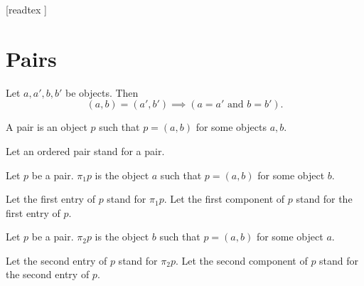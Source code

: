 \documentclass[10pt]{article}
\begin{document}
  \begin{imports}
    \begin{forthel}

      [readtex ]

    \end{forthel}
  \end{imports}


  \section{Pairs}

  \begin{forthel}
    \begin{axiom}
      Let $a, a', b, b'$ be objects.
      Then \[ (a, b) = (a', b') \implies (\text{$a = a'$ and $b = b'$}). \]
    \end{axiom}
  \end{forthel}

  \begin{forthel}
    \begin{definition}
      A pair is an object $p$ such that $p = (a, b)$ for some objects $a, b$.
    \end{definition}

    Let an ordered pair stand for a pair.
  \end{forthel}

  \begin{forthel}
    \begin{definition}
      Let $p$ be a pair.
      $\pi_{1} p$ is the object $a$ such that $p = (a, b)$ for
      some object $b$.
    \end{definition}

    Let the first entry of $p$ stand for $\pi_{1} p$.
    Let the first component of $p$ stand for the first entry of $p$.
  \end{forthel}

  \begin{forthel}
    \begin{definition}
      Let $p$ be a pair.
      $\pi_{2} p$ is the object $b$ such that $p = (a, b)$ for
      some object $a$.
    \end{definition}

    Let the second entry of $p$ stand for $\pi_{2} p$.
    Let the second component of $p$ stand for the second entry of $p$.
  \end{forthel}
\end{document}
